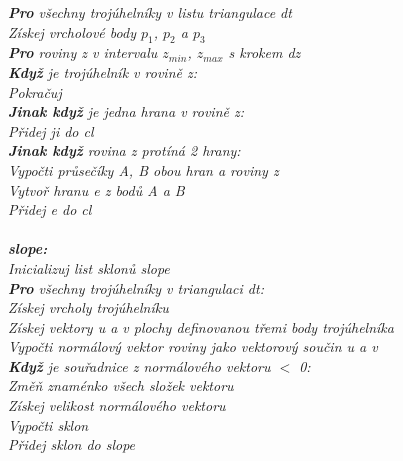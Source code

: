\documentclass{article}
\begin{document}
\indent\textit{\textbf{Pro} všechny trojúhelníky v listu triangulace dt}\\
\indent\indent\textit{Získej vrcholové body $p_{1}$, $p_{2}$ a $p_{3}$}\\
\indent\indent\textit{\textbf{Pro} roviny z v intervalu $z_{min}$, $z_{max}$ s krokem dz}\\
\indent\indent\indent\textit{\textbf{Když} je trojúhelník v rovině z:}\\
\indent\indent\indent\indent\textit{Pokračuj}\\
\indent\indent\indent\textit{\textbf{Jinak když} je jedna hrana v rovině z:}\\
\indent\indent\indent\indent\textit{Přidej ji do cl}\\
\indent\indent\indent\textit{\textbf{Jinak když} rovina z protíná 2 hrany:}\\
\indent\indent\indent\indent\textit{Vypočti průsečíky A, B obou hran a roviny z}\\
\indent\indent\indent\indent\textit{Vytvoř hranu e z bodů A a B}\\
\indent\indent\indent\indent\textit{Přidej e do cl}\\
\vspace{0.2cm}\\
\indent\textit{\textbf{slope:}}\\
\indent\textit{Inicializuj list sklonů slope}\\
\indent\textit{\textbf{Pro} všechny trojúhelníky v triangulaci dt:}\\
\indent\indent\textit{Získej vrcholy trojúhelníku}\\
\indent\indent\textit{Získej vektory u a v plochy definovanou třemi body trojúhelníka}\\
\indent\indent\textit{Vypočti normálový vektor roviny jako vektorový součin u a v}\\
\indent\indent\textit{\textbf{Když} je souřadnice z normálového vektoru $<$ 0:}\\
\indent\indent\indent\textit{Změň znaménko všech složek vektoru}\\
\indent\indent\textit{Získej velikost normálového vektoru}\\
\indent\indent\textit{Vypočti sklon}\\
\indent\indent\textit{Přidej sklon do slope}\\
\vspace{0.2cm}\\
\end{document}
